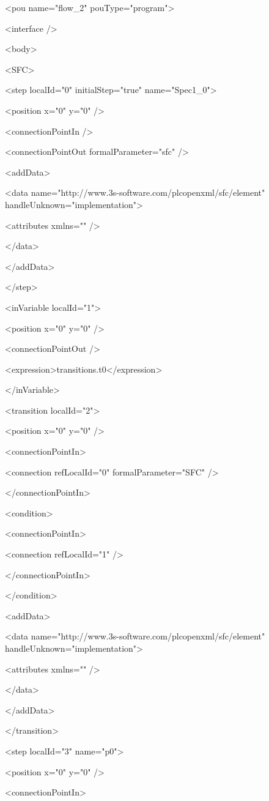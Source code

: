 <pou name="flow\_2" pouType="program">

<interface />

<body>

<SFC>

 <step localId="0" initialStep="true" name="Spec1\_0">

  <position x="0" y="0" />

  <connectionPointIn />

  <connectionPointOut formalParameter="sfc" />

  <addData>

   <data name="http://www.3s-software.com/plcopenxml/sfc/element" handleUnknown="implementation">

    <attributes xmlns="" />

   </data>

  </addData>

 </step>

 <inVariable localId="1">

  <position x="0" y="0" />

  <connectionPointOut />

  <expression>transitions.t0</expression>

 </inVariable>

 <transition localId="2">

  <position x="0" y="0" />

  <connectionPointIn>

   <connection refLocalId="0" formalParameter="SFC" />

  </connectionPointIn>

  <condition>

   <connectionPointIn>

    <connection refLocalId="1" />

   </connectionPointIn>

  </condition>

  <addData>

   <data name="http://www.3s-software.com/plcopenxml/sfc/element" handleUnknown="implementation">

    <attributes xmlns="" />

   </data>

  </addData>

 </transition>

 <step localId="3" name="p0">

  <position x="0" y="0" />

  <connectionPointIn>

